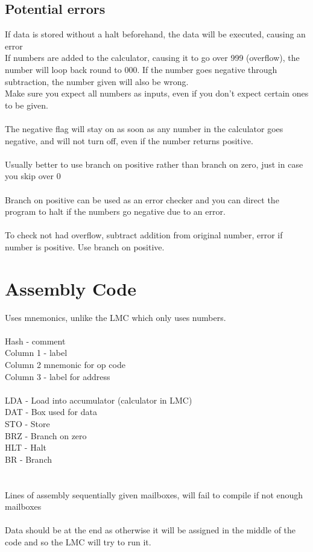 \documentclass{article}[18pt]
\begin{document}
\subsection{Potential errors}
If data is stored without a halt beforehand, the data will be executed, causing an error\\
If numbers are added to the calculator, causing it to go over 999 (overflow), the number will loop back round to 000. If the number goes negative through subtraction, the number given will also be wrong.\\
Make sure you expect all numbers as inputs, even if you don't expect certain ones to be given.\\
\\
The negative flag will stay on as soon as any number in the calculator goes negative, and will not turn off, even if the number returns positive.\\
\\
Usually better to use branch on positive rather than branch on zero, just in  case you skip over 0\\
\\
Branch on positive can be used as an error checker and you can direct the program to halt if the numbers go negative due to an error.\\
\\
To check not had overflow, subtract addition from original number, error if number is positive. Use branch on positive.

\section{Assembly Code}
Uses mnemonics, unlike the LMC which only uses numbers.\\
\\
Hash - comment\\
Column 1  - label\\
Column 2 mnemonic for op code\\
Column 3  - label for address\\
\\
LDA - Load into accumulator (calculator in LMC)\\
DAT - Box used for data\\
STO - Store\\
BRZ - Branch on zero\\
HLT - Halt\\
BR - Branch\\
\\
\\
Lines of assembly sequentially given mailboxes, will fail to compile if not enough mailboxes\\
\\
Data should be at the end as otherwise it will be assigned in the middle of the code and so the LMC will try to run it.
\end{document}

